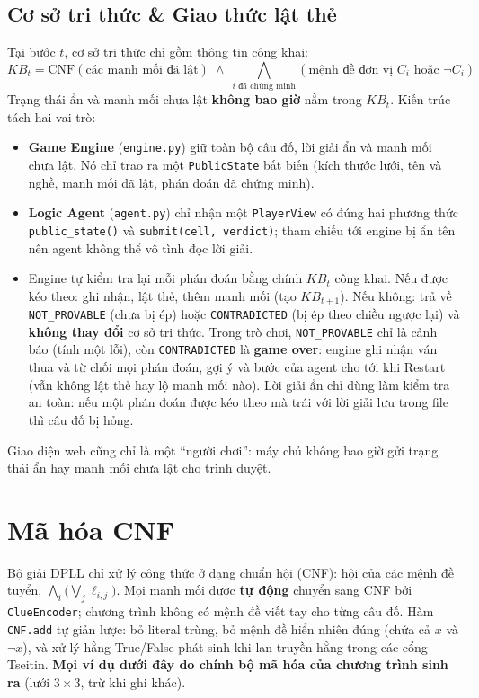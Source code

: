 \documentclass{article}
\newcommand{\code}[1]{\texttt{#1}}
\newcommand{\KB}{\mathit{KB}}
\begin{document}
\subsection{Cơ sở tri thức \& Giao thức lật thẻ}
Tại bước $t$, cơ sở tri thức chỉ gồm thông tin công khai:
\begin{equation}
\KB_t = \text{CNF}(\text{các manh mối đã lật}) \;\land\; \bigwedge_{i \text{ đã chứng minh}} (\text{mệnh đề đơn vị } C_i \text{ hoặc } \neg C_i)
\end{equation}
Trạng thái ẩn và manh mối chưa lật \textbf{không bao giờ} nằm trong $\KB_t$. Kiến trúc tách hai vai trò:
\begin{itemize}[noitemsep]
    \item \textbf{Game Engine} (\code{engine.py}) giữ toàn bộ câu đố, lời giải ẩn và manh mối chưa lật. Nó chỉ trao ra một \code{PublicState} bất biến (kích thước lưới, tên và nghề, manh mối đã lật, phán đoán đã chứng minh).
    \item \textbf{Logic Agent} (\code{agent.py}) chỉ nhận một \code{PlayerView} có đúng hai phương thức \code{public\_state()} và \code{submit(cell, verdict)}; tham chiếu tới engine bị ẩn tên nên agent không thể vô tình đọc lời giải.
    \item Engine tự kiểm tra lại mỗi phán đoán bằng chính $\KB_t$ công khai. Nếu được kéo theo: ghi nhận, lật thẻ, thêm manh mối (tạo $\KB_{t+1}$). Nếu không: trả về \code{NOT\_PROVABLE} (chưa bị ép) hoặc \code{CONTRADICTED} (bị ép theo chiều ngược lại) và \textbf{không thay đổi} cơ sở tri thức. Trong trò chơi, \code{NOT\_PROVABLE} chỉ là cảnh báo (tính một lỗi), còn \code{CONTRADICTED} là \textbf{game over}: engine ghi nhận ván thua và từ chối mọi phán đoán, gợi ý và bước của agent cho tới khi Restart (vẫn không lật thẻ hay lộ manh mối nào). Lời giải ẩn chỉ dùng làm kiểm tra an toàn: nếu một phán đoán được kéo theo mà trái với lời giải lưu trong file thì câu đố bị hỏng.
\end{itemize}
Giao diện web cũng chỉ là một ``người chơi'': máy chủ không bao giờ gửi trạng thái ẩn hay manh mối chưa lật cho trình duyệt.

\section{Mã hóa CNF}

Bộ giải DPLL chỉ xử lý công thức ở dạng chuẩn hội (CNF): hội của các mệnh đề tuyển, $\bigwedge_i \big( \bigvee_j \ell_{i,j} \big)$. Mọi manh mối được \textbf{tự động} chuyển sang CNF bởi \code{ClueEncoder}; chương trình không có mệnh đề viết tay cho từng câu đố. Hàm \code{CNF.add} tự giản lược: bỏ literal trùng, bỏ mệnh đề hiển nhiên đúng (chứa cả $x$ và $\neg x$), và xử lý hằng True/False phát sinh khi lan truyền hằng trong các cổng Tseitin. \textbf{Mọi ví dụ dưới đây do chính bộ mã hóa của chương trình sinh ra} (lưới $3\times3$, trừ khi ghi khác).
\end{document}
